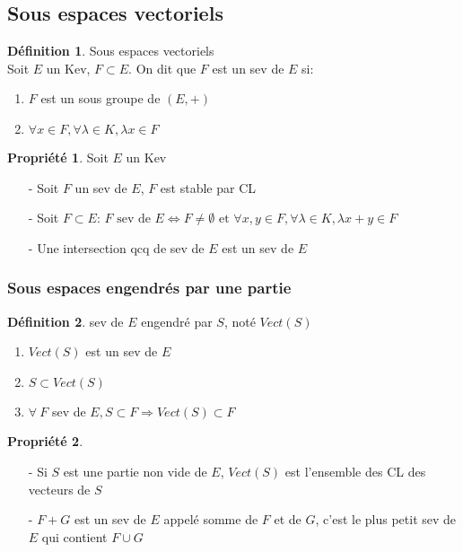 \documentclass[fleqn]{article}
\theoremstyle{definition} \newtheorem*{defi}{D\'efinition}
\theoremstyle{definition} \newtheorem*{theo}{Th\'eor\`eme}
\theoremstyle{definition} \newtheorem*{coro}{Corollaire}
\theoremstyle{definition} \newtheorem*{nota}{Notation}
\theoremstyle{remark} \newtheorem*{rqs}{Remarques}
\theoremstyle{definition} \newtheorem*{prop}{Propri\'et\'e}
\begin{document}
\subsection{Sous espaces vectoriels}
\begin{defi} Sous espaces vectoriels \\Soit $E$ un Kev, $F \subset E$. On dit que $F$ est un sev de $E$ si:
	\begin{enumerate}
		\item $F$ est un sous groupe de $(E, +)$
		\item $\forall x \in F,\forall \lambda \in K, \lambda x \in F$
	\end{enumerate}
\end{defi}

\begin{prop} Soit $E$ un Kev
	\begin{enumerate}
		\item [-] Soit $F$ un sev de $E$, $F$ est stable par CL
		\item [-] Soit $F \subset E$:
			$F \text{ sev de } E \Leftrightarrow F \neq \emptyset \text{ et } \forall x,y \in F, \forall \lambda \in K, \lambda x + y \in F$
		\item [-] Une intersection qcq de sev de $E$ est un sev de $E$
	\end{enumerate}
\end{prop}

\subsubsection{Sous espaces engendr\'es par une partie}
\begin{defi} sev de $E$ engendr\'e par $S$, not\'e $Vect(S)$
	\begin{enumerate}
		\item $Vect(S)$ est un sev de $E$
		\item $S \subset Vect(S)$
		\item $\forall\ F$ sev de $E, S \subset F \Rightarrow Vect(S) \subset F$
	\end{enumerate}
\end{defi}

\begin{prop} $ $
	\begin{enumerate}
		\item [-] Si $S$ est une partie non vide de $E$, $Vect(S)$ est l'ensemble des CL des vecteurs de $S$
		\item [-] $F+G$  est un sev de $E$ appel\'e somme de $F$ et de $G$, c'est le plus petit sev de $E$ qui contient $F\cup G$
	\end{enumerate}
\end{prop}
\end{document}
